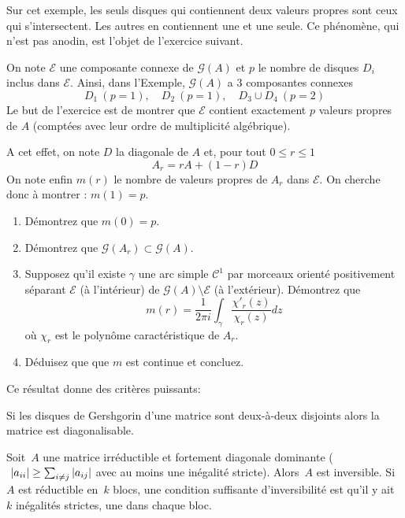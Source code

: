 Sur cet exemple, les seuls disques qui contiennent deux valeurs propres sont
ceux qui s'intersectent. Les autres en contiennent une et une seule. Ce
phénomène, qui n'est pas anodin, est l'objet de l'exercice suivant.

\begin{exercice}
\label{ex:gersh} On note $\mathcal E$ une composante connexe de $\mathcal
G(A)$ et $p$ le nombre de disques $D_i$ inclus dans $\mathcal E$. Ainsi, dans
l'Exemple, $\mathcal G(A)$ a 3 composantes connexes
\[
D_1 \ (p = 1),\quad D_2 \ (p = 1), \quad D_3 \cup D_4 \ (p= 2)
\]
Le but de l'exercice est de montrer que $\mathcal E$ contient exactement $p$
valeurs propres de $A$ (comptées avec leur ordre de multiplicité algébrique). 

A cet effet, on note $D$ la diagonale de $A$ et, pour tout $0 \leq r \leq 1$
\[
A_r = rA + (1-r)D
\]
On note enfin $m(r)$ le nombre de valeurs propres de $A_r$ dans $\mathcal E$.
On cherche donc à montrer : $m(1) = p$.
\begin{enumerate}
\item Démontrez que $m(0) = p$.
\item Démontrez que $\mathcal G(A_r) \subset \mathcal G(A)$.
\item {Supposez qu'il existe} $\gamma$ une arc simple $\mathcal C^1$ par
	morceaux orienté positivement séparant $\mathcal E$ (à l'intérieur) de
	$\mathcal G(A) \setminus \mathcal E$ (à l'extérieur). Démontrez que
\[
	m(r) = \frac1{2\pi i}\int_{\gamma} \frac{\chi'_{r}(z)}{\chi_{r}(z)}dz
\]
où $\chi_{r}$ est le polynôme caractéristique de $A_r$.
\item Déduisez que que $m$ est continue et concluez.
\end{enumerate}
\end{exercice}

Ce résultat donne des critères puissants:

\begin{corollary}
	Si les disques de Gershgorin d'une matrice sont deux-à-deux disjoints alors
	la matrice est diagonalisable.
\end{corollary}

\begin{proposition}
	Soit~$A$ une matrice irréductible et fortement diagonale dominante
	($\ \left|a_{ii}\right|\ge\sum_{i\neq j}\left|a_{ij}\right|$ avec au moins une inégalité
	stricte).  Alors~$A$ est inversible.  Si~$A$ est réductible en~$k$ blocs,
	une condition suffisante d'inversibilité est qu'il y ait~$k$ inégalités
	strictes, une dans chaque bloc.
\end{proposition}

